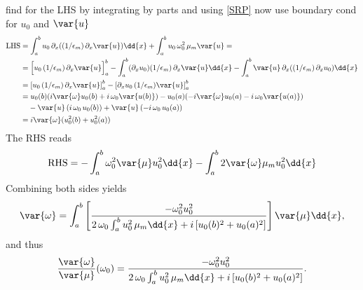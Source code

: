 find for the LHS by integrating by parts and using \eqref{SRP}
now use boundary cond for $u_0$ and $\var{u}$
\begin{align*}
    \text{LHS} &= \int_a^b u_0 \, \partial_x ((1/\epsilon_m) \, \partial_x \var{u})\dd{x} + \int_a^b u_0 \, \omega_0^2 \, \mu_m \var{u} =\\
    &= \Big [  u_0 \, (1/\epsilon_m) \, \partial_x \var{u} \Big ]_a^b - \int_a^b (\partial_x u_0) (1/\epsilon_m)\, \partial_x \var{u} \dd{x} - \int_a^b \var{u} \, \partial_x((1/\epsilon_m) \, \partial_x u_0) \dd{x} \\
    &= \left[ u_0 \,  (1/\epsilon_m) \, \partial_x \var{u} \right]_a^b - \left[ \partial_x u_0 \, (1/\epsilon_m) \var{u} \right]_a^b \\
    &= u_0(b) (i \var{\omega} u_0(b) + i\, \omega_0 \var{u(b)}) - u_0(a) (-i\var{\omega} u_0(a) - i\, \omega_0 \var{u(a)})\\
    &\phantom{{}=} - \var{u} \, (i \, \omega_0 \, u_0(b)) + \var{u} \, (-i \, \omega_0 \, u_0(a))\\
    &= i \var{\omega} (u_0^2(b) + u_0^2(a))
\end{align*}
The RHS reads
\begin{align*}
    \text{RHS} = -\int_a^b \omega_0^2 \var{\mu} u_0^2 \dd{x} - \int_a^b 2 \var{\omega} \mu_m u_0^2 \dd {x}
\end{align*}
Combining both sides yields
\begin{equation}
    \var{\omega} = \int_a^b \left[ \frac{-\omega_0^2 u_0^2}{2 \, \omega_0 \int_a^b u_0^2 \, \mu_m \dd{x} + i \left[u_0(b)^2 + u_0(a)^2\right]} \right] \var{\mu} \dd{x},
\end{equation}
and thus 
\begin{equation}
    \frac{\var{\omega}}{\var{\mu}} (\omega_0) = \frac{-\omega_0^2 u_0^2}{2 \, \omega_0 \int_a^b u_0^2 \, \mu_m \dd{x} + i \left[u_0(b)^2 + u_0(a)^2\right]}.
\end{equation}
%
%
%
%
